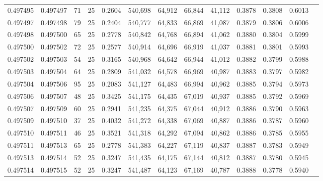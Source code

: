 \begin{tabular}{rrrrrrrrrrrrr}
0.497495 & 0.497497 &    71 &  25 &                                     0.2604 & 540,698 &  64,912 &  66,844 &  41,112 & 0.3878 & 0.3808 & 0.6013 \\
0.497497 & 0.497498 &    79 &  25 &                                     0.2404 & 540,777 &  64,833 &  66,869 &  41,087 & 0.3879 & 0.3806 & 0.6006 \\
0.497498 & 0.497500 &    65 &  25 &                                     0.2778 & 540,842 &  64,768 &  66,894 &  41,062 & 0.3880 & 0.3804 & 0.5999 \\
0.497500 & 0.497502 &    72 &  25 &                                     0.2577 & 540,914 &  64,696 &  66,919 &  41,037 & 0.3881 & 0.3801 & 0.5993 \\
0.497502 & 0.497503 &    54 &  25 &                                     0.3165 & 540,968 &  64,642 &  66,944 &  41,012 & 0.3882 & 0.3799 & 0.5988 \\
0.497503 & 0.497504 &    64 &  25 &                                     0.2809 & 541,032 &  64,578 &  66,969 &  40,987 & 0.3883 & 0.3797 & 0.5982 \\
0.497504 & 0.497506 &    95 &  25 &                                     0.2083 & 541,127 &  64,483 &  66,994 &  40,962 & 0.3885 & 0.3794 & 0.5973 \\
0.497506 & 0.497507 &    48 &  25 &                                     0.3425 & 541,175 &  64,435 &  67,019 &  40,937 & 0.3885 & 0.3792 & 0.5969 \\
0.497507 & 0.497509 &    60 &  25 &                                     0.2941 & 541,235 &  64,375 &  67,044 &  40,912 & 0.3886 & 0.3790 & 0.5963 \\
0.497509 & 0.497510 &    37 &  25 &                                     0.4032 & 541,272 &  64,338 &  67,069 &  40,887 & 0.3886 & 0.3787 & 0.5960 \\
0.497510 & 0.497511 &    46 &  25 &                                     0.3521 & 541,318 &  64,292 &  67,094 &  40,862 & 0.3886 & 0.3785 & 0.5955 \\
0.497511 & 0.497513 &    65 &  25 &                                     0.2778 & 541,383 &  64,227 &  67,119 &  40,837 & 0.3887 & 0.3783 & 0.5949 \\
0.497513 & 0.497514 &    52 &  25 &                                     0.3247 & 541,435 &  64,175 &  67,144 &  40,812 & 0.3887 & 0.3780 & 0.5945 \\
0.497514 & 0.497515 &    52 &  25 &                                     0.3247 & 541,487 &  64,123 &  67,169 &  40,787 & 0.3888 & 0.3778 & 0.5940 \\

\end{tabular}
